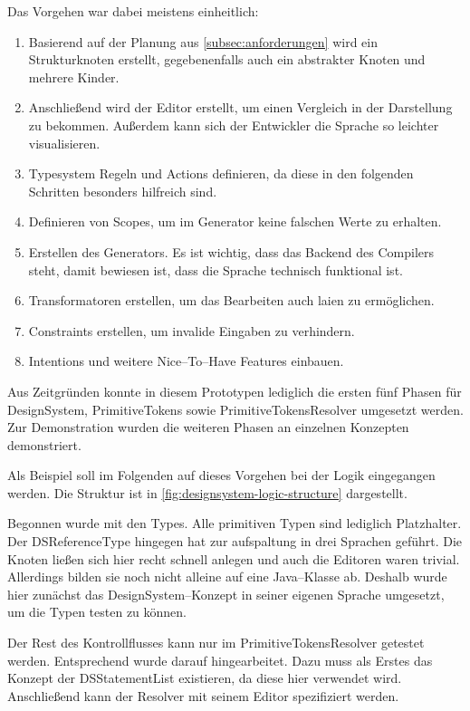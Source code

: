 Das Vorgehen war dabei meistens einheitlich:
\begin{enumerate}
    \item Basierend auf der Planung aus \autoref{subsec:anforderungen} wird ein Strukturknoten erstellt, gegebenenfalls auch ein abstrakter Knoten und mehrere Kinder.
    \item Anschließend wird der Editor erstellt, um einen Vergleich in der Darstellung zu bekommen.
    Außerdem kann sich der Entwickler die Sprache so leichter visualisieren.
    \item Typesystem Regeln und Actions definieren, da diese in den folgenden Schritten besonders hilfreich sind.
    \item Definieren von Scopes, um im Generator keine falschen Werte zu erhalten.
    \item Erstellen des Generators.
    Es ist wichtig, dass das Backend des Compilers steht, damit bewiesen ist, dass die Sprache technisch funktional ist.
    \item Transformatoren erstellen, um das Bearbeiten auch laien zu ermöglichen.
    \item Constraints erstellen, um invalide Eingaben zu verhindern.
    \item Intentions und weitere Nice--To--Have Features einbauen.
\end{enumerate}

Aus Zeitgründen konnte in diesem Prototypen lediglich die ersten fünf Phasen für DesignSystem, PrimitiveTokens sowie PrimitiveTokensResolver umgesetzt werden.
Zur Demonstration wurden die weiteren Phasen an einzelnen Konzepten demonstriert.

Als Beispiel soll im Folgenden auf dieses Vorgehen bei der Logik eingegangen werden.
Die Struktur ist in \autoref{fig:designsystem-logic-structure} dargestellt.

Begonnen wurde mit den Types.
Alle primitiven Typen sind lediglich Platzhalter.
Der {\ttfamily DSReferenceType} hingegen hat zur aufspaltung in drei Sprachen geführt.
Die Knoten ließen sich hier recht schnell anlegen und auch die Editoren waren trivial.
Allerdings bilden sie noch nicht alleine auf eine Java--Klasse ab.
Deshalb wurde hier zunächst das DesignSystem--Konzept in seiner eigenen Sprache umgesetzt, um die Typen testen zu können.

Der Rest des Kontrollflusses kann nur im PrimitiveTokensResolver getestet werden.
Entsprechend wurde darauf hingearbeitet.
Dazu muss als Erstes das Konzept der {\ttfamily DSStatementList} existieren, da diese hier verwendet wird.
Anschließend kann der Resolver mit seinem Editor spezifiziert werden.

